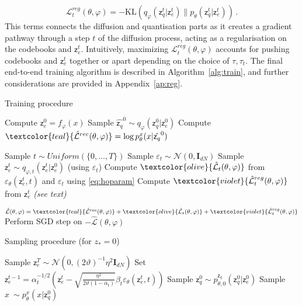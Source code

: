 \documentclass{article}
\theoremstyle{plain}
\theoremstyle{definition}
\theoremstyle{remark}
\newcommand{\latentcont}{\mathsf{z}_e}
\newcommand{\latentdis}{\mathsf{z}_q}
\begin{document}
\begin{equation}
    \mathcal{L}^{reg}_t(\theta,\varphi) = -\mathrm{KL}(q_\varphi(\latentdis^{t}|\latentcont^{t})\|p_\theta(\latentdis^{t}|\latentcont^{t}))\,. 
\end{equation}
This terms connects the diffusion and quantisation parts as it creates a gradient pathway through a step $t$ of the diffusion process, acting as a regularisation on the codebooks and $\latentcont^t$. Intuitively, maximizing $\mathcal{L}^{reg}_t(\theta,\varphi)$  accounts for pushing codebooks and $\latentcont^t$ together or apart depending on the choice of $\tau, \tau_t$. The final end-to-end training algorithm is described in Algorithm~\ref{alg:train}, and further considerations are provided  in Appendix~\ref{ap:reg}.


\begin{algorithm}[tb]
   \caption{Training procedure}
   \label{alg:train}
\begin{algorithmic}
   \REPEAT
   

   \STATE Compute $\latentcont^0= f_\varphi(x)$ 
   \STATE Sample $\hat{\latentdis}^0 \sim q_\varphi(\latentdis^0|\latentcont^0)$
   \STATE Compute $\textcolor{teal}{\hat{\mathcal{L}}^{rec}(\theta,\varphi)} = \log p^x_{\theta}(x|\hat{\latentdis}^0)$ 

   \STATE Sample $t \sim Uniform(\{0,\ldots, T\})$ 
   \STATE Sample $\varepsilon_t \sim \mathcal{N}(0,\mathbf{I}_{dN})$
   \STATE Sample $\latentcont^{t} \sim q_{\varphi,t}(\latentcont^t|\latentcont^0)$ (using $\varepsilon_t$)
   \STATE Compute $\textcolor{olive}{\hat{\mathcal{L}}_t(\theta,\varphi)}$ from $\varepsilon_\theta(\latentcont^{t},t)$ and $\varepsilon_t$ using \eqref{eq:hoparam}
   \STATE Compute $\textcolor{violet}{\hat{\mathcal{L}}^{reg}_t(\theta,\varphi)}$ from $\latentcont^{t}$ \textit{(see text)}

   \STATE $\hat{\mathcal{L}}(\theta,\varphi) = \textcolor{teal}{\hat{\mathcal{L}}^{rec}(\theta,\varphi)} + \textcolor{olive}{\hat{\mathcal{L}}_t(\theta,\varphi)} + \textcolor{violet}{\hat{\mathcal{L}}^{reg}_t(\theta,\varphi)}$
   \STATE Perform SGD step on $-\hat{\mathcal{L}}(\theta,\varphi)$
\end{algorithmic}
\end{algorithm}

\begin{algorithm}[tb]
   \caption{Sampling procedure (for $z_* = 0$)}
   \label{alg:sample}
\begin{algorithmic}
   
   \STATE Sample $\latentcont^T \sim \mathcal{N}(0, (2\vartheta)^{-1}\eta^2 \mathbf{I}_{dN})$ 
   \STATE Set $\latentcont^{t-1} = \alpha_t^{-1/2}\left(\latentcont^t - \sqrt{\frac{\eta^2}{2\vartheta (1-\bar{\alpha}_t)}}\beta_t\varepsilon_\theta(\latentcont^{t},t)\right)$
   \ENDFOR
   \STATE  Sample $\latentdis^0 \sim  p^{\latentdis}_{\theta,0}(\latentdis^0|\latentcont^0)$ 
   \STATE Sample $x ~ \sim  p^x_{\theta}(x|\latentdis^0)$ 
\end{algorithmic}
\end{algorithm}
\end{document}
